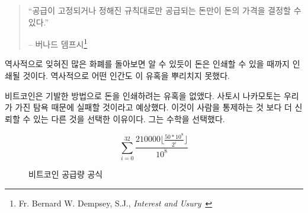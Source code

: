 \begin{quotation}\begin{samepage}
\begin{comment}	
\enquote{A fixed money supply, or a supply altered only in accord with
objective and calculable criteria, is a necessary condition to a
meaningful just price of money.}
\end{comment}
\enquote{공급이 고정되거나 정해진 규칙대로만 공급되는 돈만이 돈의 가격을 결정할 수 있다.}
\begin{flushright} -- 버나드 뎀프시\footnote{Fr. Bernard W. Dempsey, S.J., \textit{Interest and Usury}~\cite[p.~210]{dempsey_interest_1943}}
\end{flushright}\end{samepage}\end{quotation}

\newpage

\begin{comment}	
As a quick stroll through the graveyard of forgotten currencies has
shown, money which can be printed will be printed. So far, no human in
history was able to resist this temptation.
\end{comment}
역사적으로 잊혀진 많은 화폐를 돌아보면 알 수 있듯이 돈은 인쇄할 수 있을 때까지 인쇄될 것이다. 
역사적으로 어떤 인간도 이 유혹을 뿌리치지 못했다.

\begin{comment}	
Bitcoin does away with the temptation to print money in an ingenious
way. Satoshi was aware of our greed and fallibility --- this is why he
chose something more reliable than human restraint: mathematics.
\end{comment}
비트코인은 기발한 방법으로 돈을 인쇄하려는 유혹을 없앴다. 
사토시 나카모토는 우리가 가진 탐욕 때문에 실패할 것이라고 예상했다.
이것이 사람을 통제하는 것 보다 더 신뢰할 수 있는 다른 것을 선택한 이유이다.
그는 수학을 선택했다.

\begin{figure}
  \centering
  \begin{equation}
  \sum\limits_{i=0}^{32} \frac{210000 \lfloor \frac{50*10^8}{2^i} \rfloor}{10^8}
  \end{equation}
  \caption{비트코인 공급량 공식}
  \label{fig:supply-formula-white}
\end{figure}

